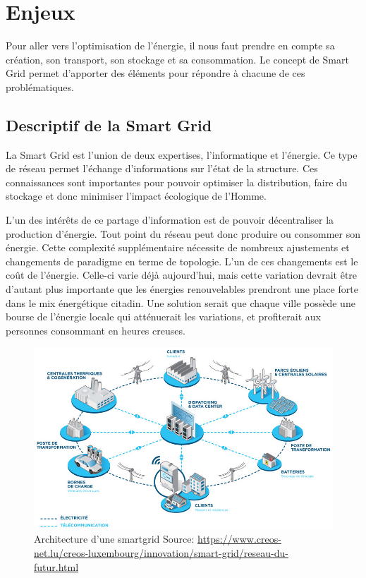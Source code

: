 \chapter{Enjeux}

Pour aller vers l'optimisation de l'énergie, il nous faut prendre en compte sa création,
son transport, son stockage et sa consommation.
Le concept de Smart Grid permet d'apporter des éléments pour répondre à chacune de ces problématiques.

\section{Descriptif de la Smart Grid}
La Smart Grid est l'union de deux expertises, l'informatique et l'énergie.
Ce type de réseau permet l'échange d'informations sur l'état de la structure.
Ces connaissances sont importantes pour pouvoir optimiser la distribution, faire du stockage
et donc minimiser l'impact écologique de l'Homme.

L'un des intérêts de ce partage d'information est de pouvoir décentraliser la production d'énergie.
Tout point du réseau peut donc produire ou consommer son énergie.
Cette complexité supplémentaire nécessite de nombreux ajustements et changements de paradigme en terme de topologie.
L'un de ces changements est le coût de l'énergie. Celle-ci varie déjà aujourd’hui, mais cette variation
devrait être d'autant plus importante que les énergies renouvelables prendront une place forte dans
le mix énergétique citadin. Une solution serait que chaque ville possède une bourse de l'énergie
locale qui atténuerait les variations, et profiterait aux personnes consommant en heures creuses.

\begin{figure}[h]
    \centering
    \includegraphics[scale=0.40]{media/smart_city_lux.jpg}
    \caption{
        Architecture d'une smartgrid\newline
        \tiny{Source: \url{https://www.creos-net.lu/creos-luxembourg/innovation/smart-grid/reseau-du-futur.html}}
    }
\end{figure}

